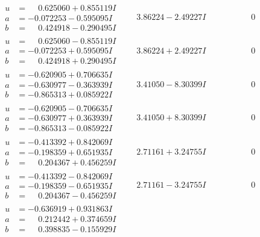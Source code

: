 \documentclass[1p]{elsarticle_modified}
\theoremstyle{definition}
\begin{document}
$$\begin{array}{c|c|c}
\begin{aligned}
u &= \phantom{-}0.625060 + 0.855119 I \\
a &= -0.072253 - 0.595095 I \\
b &= \phantom{-}0.424918 - 0.290495 I\end{aligned}
 & \phantom{-}3.86224 - 2.49227 I & \phantom{-0.000000 } 0 \\ \hline\begin{aligned}
u &= \phantom{-}0.625060 - 0.855119 I \\
a &= -0.072253 + 0.595095 I \\
b &= \phantom{-}0.424918 + 0.290495 I\end{aligned}
 & \phantom{-}3.86224 + 2.49227 I & \phantom{-0.000000 } 0 \\ \hline\begin{aligned}
u &= -0.620905 + 0.706635 I \\
a &= -0.630977 - 0.363939 I \\
b &= -0.865313 + 0.085922 I\end{aligned}
 & \phantom{-}3.41050 - 8.30399 I & \phantom{-0.000000 } 0 \\ \hline\begin{aligned}
u &= -0.620905 - 0.706635 I \\
a &= -0.630977 + 0.363939 I \\
b &= -0.865313 - 0.085922 I\end{aligned}
 & \phantom{-}3.41050 + 8.30399 I & \phantom{-0.000000 } 0 \\ \hline\begin{aligned}
u &= -0.413392 + 0.842069 I \\
a &= -0.198359 + 0.651935 I \\
b &= \phantom{-}0.204367 + 0.456259 I\end{aligned}
 & \phantom{-}2.71161 + 3.24755 I & \phantom{-0.000000 } 0 \\ \hline\begin{aligned}
u &= -0.413392 - 0.842069 I \\
a &= -0.198359 - 0.651935 I \\
b &= \phantom{-}0.204367 - 0.456259 I\end{aligned}
 & \phantom{-}2.71161 - 3.24755 I & \phantom{-0.000000 } 0 \\ \hline\begin{aligned}
u &= -0.636919 + 0.931863 I \\
a &= \phantom{-}0.212442 + 0.374659 I \\
b &= \phantom{-}0.398835 - 0.155929 I\end{aligned}

\end{array}$$
\end{document}
